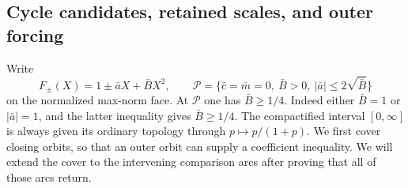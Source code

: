 \subsection{Cycle candidates, retained scales, and outer forcing}

Write
\[
 F_\pm(X)=1\pm\bar aX+\bar BX^2,\qquad
 \mathcal P=\{\bar c=\bar m=0,\ \bar B>0,\
           |\bar a|\le2\sqrt{\bar B}\}
\]
on the normalized max-norm face. At $\mathcal P$ one has
$\bar B\ge1/4$. Indeed either $\bar B=1$ or $|\bar a|=1$,
and the latter inequality gives $\bar B\ge1/4$.
The compactified interval $[0,\infty]$ is always given its ordinary
topology through $p\mapsto p/(1+p)$.
We first cover closing orbits, so that an outer orbit can supply a
coefficient inequality. We will extend the cover to the intervening
comparison arcs after proving that all of those arcs return.

